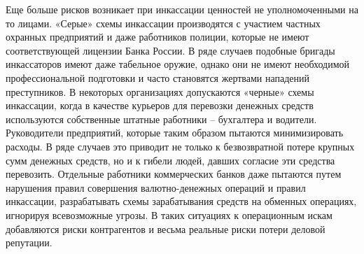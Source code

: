 \documentclass[a4paper,12pt,fleqn]{article} %
\begin{document}
Еще больше рисков возникает при инкассации ценностей не уполномоченными на то лицами. «Серые» схемы инкассации производятся с участием частных охранных предприятий и даже работников полиции, которые не имеют соответствующей лицензии Банка России. В ряде случаев подобные бригады инкассаторов имеют даже табельное оружие, однако они не имеют необходимой профессиональной подготовки и часто становятся жертвами нападений преступников. В некоторых организациях допускаются «черные» схемы инкассации, когда в качестве курьеров для перевозки денежных средств используются собственные штатные работники – бухгалтера и водители. Руководители предприятий, которые таким образом пытаются минимизировать расходы. В ряде случаев это приводит не только к безвозвратной потере крупных сумм денежных средств, но и к гибели людей, давших согласие эти средства перевозить. Отдельные работники коммерческих банков даже пытаются путем нарушения правил совершения валютно-денежных операций и правил инкассации, разрабатывать схемы зарабатывания средств на обменных операциях, игнорируя всевозможные угрозы. В таких ситуациях к операционным искам добавляются риски контрагентов и весьма реальные риски потери деловой репутации.\\
	
\end{document}
